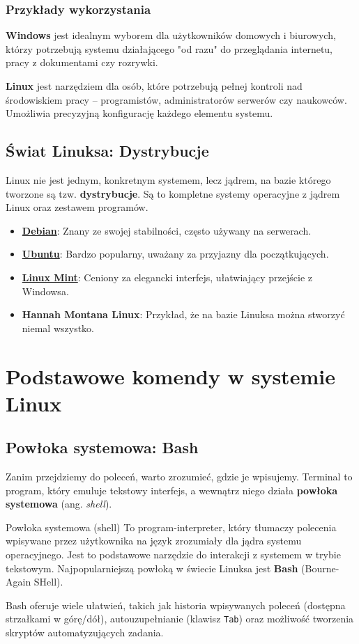 \subsubsection{Przykłady wykorzystania}
\textbf{Windows} jest idealnym wyborem dla użytkowników domowych i biurowych, którzy potrzebują systemu działającego "od razu" do przeglądania internetu, pracy z dokumentami czy rozrywki.

\textbf{Linux} jest narzędziem dla osób, które potrzebują pełnej kontroli nad środowiskiem pracy -- programistów, administratorów serwerów czy naukowców. Umożliwia precyzyjną konfigurację każdego elementu systemu.

\subsection{Świat Linuksa: Dystrybucje}
Linux nie jest jednym, konkretnym systemem, lecz jądrem, na bazie którego tworzone są tzw. \textbf{dystrybucje}. Są to kompletne systemy operacyjne z jądrem Linux oraz zestawem programów.
\begin{itemize}
    \item \href{https://www.debian.org/}{\textbf{Debian}}: Znany ze swojej stabilności, często używany na serwerach.
    \item \href{https://ubuntu.com/}{\textbf{Ubuntu}}: Bardzo popularny, uważany za przyjazny dla początkujących.
    \item \href{https://linuxmint.com/}{\textbf{Linux Mint}}: Ceniony za elegancki interfejs, ułatwiający przejście z Windowsa.
    \item \textbf{Hannah Montana Linux}: Przykład, że na bazie Linuksa można stworzyć niemal wszystko.
\end{itemize}

\section{Podstawowe komendy w systemie Linux}

\subsection{Powłoka systemowa: Bash}
Zanim przejdziemy do poleceń, warto zrozumieć, gdzie je wpisujemy. Terminal to program, który emuluje tekstowy interfejs, a wewnątrz niego działa \textbf{powłoka systemowa} (ang. \textit{shell}).
\begin{definitionbox}{Powłoka systemowa (shell)}
To program-interpreter, który tłumaczy polecenia wpisywane przez użytkownika na język zrozumiały dla jądra systemu operacyjnego. Jest to podstawowe narzędzie do interakcji z systemem w trybie tekstowym. Najpopularniejszą powłoką w świecie Linuksa jest \textbf{Bash} (Bourne-Again SHell).
\end{definitionbox}
Bash oferuje wiele ułatwień, takich jak historia wpisywanych poleceń (dostępna strzałkami w górę/dół), autouzupełnianie (klawisz \texttt{Tab}) oraz możliwość tworzenia skryptów automatyzujących zadania.

